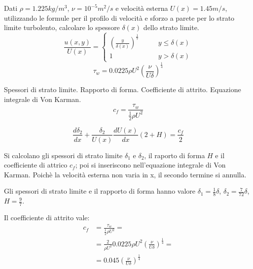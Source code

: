 \noindent
\begin{exerciseS}
Dati $\rho = 1.225 kg/m^3$, $\nu = 10^{-5} m^2/s$ e velocità esterna $U(x) = 1.45 m/s$, utilizzando le formule per il profilo di velocità e sforzo a parete per lo strato limite turbolento, calcolare lo spessore $\delta(x)$ dello strato limite.
\begin{equation}
  \frac{u(x,y)}{U(x)} = 
  \begin{cases}
    \displaystyle\left( \frac{y}{\delta(x)} \right)^{\frac{1}{7}} &  \qquad y \le \delta(x) \\
    1 &  \qquad y > \delta(x)
  \end{cases}
\end{equation}
\begin{equation}
  \tau_w = 0.0225 \rho U^2 \displaystyle \left( \frac{\nu}{U \delta} \right) ^ {\frac{1}{4}}
\end{equation}

\end{exerciseS}

\sol

\partone Spessori di strato limite. Rapporto di forma. Coefficiente di attrito. Equazione integrale di Von Karman.
\begin{equation}
  c_f = \frac{\tau_w}{\frac{1}{2}\rho U^2 }
\end{equation}

\begin{equation}\label{eqn:VK}
  \frac{d \delta_2}{dx} + \frac{\delta_2}{U(x)}\frac{d U(x)}{dx} (2+H) = \frac{c_f}{2}
\end{equation}

\parttwo Si calcolano gli spessori di strato limite $\delta_1$ e $\delta_2$, il raporto di forma $H$ e il coefficiente di attrico $c_f$; poi si inseriscono nell'equazione integrale di Von Karman.
Poichè la velocità esterna non varia in x, il secondo termine si annulla.

Gli spessori di strato limite e il rapporto di forma hanno valore $\delta_1 = \frac{1}{8}\delta$,
 $\delta_2 = \frac{7}{72}\delta$, $H = \frac{9}{7}$.

Il coefficiente di attrito vale:
\begin{equation}
\begin{aligned}
  c_f & = \frac{\tau_w}{\frac{1}{2}\rho U^2 } = \\
  & = \frac{2}{\rho U^2} 0.0225 \rho U^2 
  \displaystyle \left( \frac{\nu}{U \delta} \right)^{\frac{1}{4}} = \\
      & = 0.045 \displaystyle \left( \frac{\nu}{U \delta} \right)^{\frac{1}{4}}
\end{aligned}
\end{equation}

